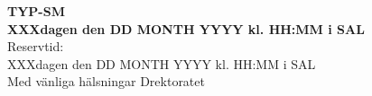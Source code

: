 \documentclass[a4paper,12pt]{article}
\begin{document}
\vspace*{\fill}
\begin{center}
{\Huge \bf TYP-SM}\\ %
{\LARGE \bf XXXdagen den DD MONTH YYYY kl. HH:MM i SAL}\\
{\Large Reservtid:}\\
{\Large XXXdagen den DD MONTH YYYY kl. HH:MM i SAL}\\



\vspace{1in}
{\LARGE Med vänliga hälsningar Drektoratet}
\end{center}
\vspace*{\fill}
\end{document}

